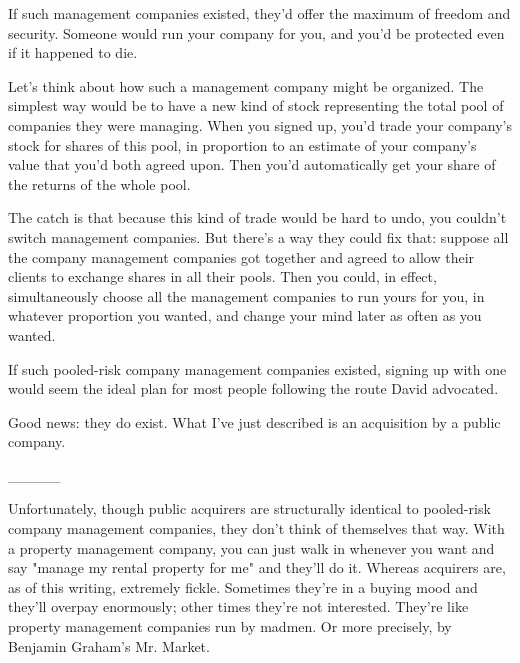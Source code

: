 If such management
                  companies existed, they'd offer the maximum of freedom and
                  security. Someone would run your company for you, and you'd be
                  protected even if it happened to die.

Let's think
                  about how such a management company might be organized. The
                  simplest way would be to have a new kind of stock representing
                  the total pool of companies they were managing. When you
                  signed up, you'd trade your company's stock for shares of this
                  pool, in proportion to an estimate of your company's value
                  that you'd both agreed upon. Then you'd automatically get your
                  share of the returns of the whole pool.

The catch
                  is that because this kind of trade would be hard to undo, you
                  couldn't switch management companies. But there's a way they
                  could fix that: suppose all the company management companies
                  got together and agreed to allow their clients to exchange
                  shares in all their pools. Then you could, in effect,
                  simultaneously choose all the management companies to run
                  yours for you, in whatever proportion you wanted, and change
                  your mind later as often as you wanted.

If such
                  pooled-risk company management companies existed, signing up
                  with one would seem the ideal plan for most people following
                  the route David advocated.

Good news: they do
                  exist. What I've just described is an acquisition by a public
                  company.


                  \_\_\_\_\_
                  

Unfortunately, though public acquirers are
                  structurally identical to pooled-risk company management
                  companies, they don't think of themselves that way. With a
                  property management company, you can just walk in whenever you
                  want and say "manage my rental property for me" and they'll do
                  it. Whereas acquirers are, as of this writing, extremely
                  fickle. Sometimes they're in a buying mood and they'll overpay
                  enormously; other times they're not interested. They're like
                  property management companies run by madmen. Or more
                  precisely, by Benjamin Graham's Mr. Market.

